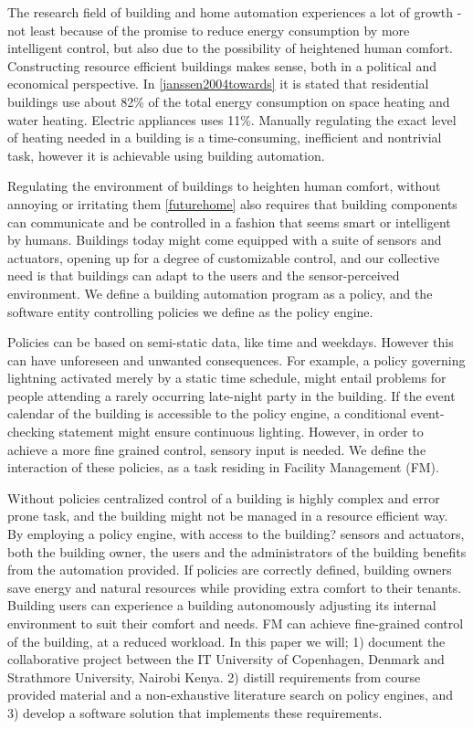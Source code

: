 The research field of building and home automation experiences a lot of growth - not least because of the promise to reduce energy consumption by more intelligent control, but also due to the possibility of heightened human comfort. Constructing resource efficient buildings makes sense, both in a political and economical perspective. In \ref{janssen2004towards} it is stated that residential buildings use about 82\% of the total energy consumption on space heating and water heating. Electric appliances uses 11\%. Manually regulating the exact level of heating needed in a building is a time-consuming, inefficient and nontrivial task, however it is achievable using building automation. 

Regulating the environment of buildings to heighten human comfort, without annoying or irritating them \ref{futurehome} also requires that building components can communicate and be controlled in a fashion that seems smart or intelligent by humans. Buildings today might come equipped with a suite of sensors and actuators, opening up for a degree of customizable control, and our collective need is that buildings can adapt to the users and the sensor-perceived environment. We define a building automation program as a policy, and the software entity controlling policies we define as the policy engine.

Policies can be based on semi-static data, like time and weekdays. However this can have unforeseen and unwanted consequences. For example, a policy governing lightning activated merely by a static time schedule, might entail problems for people attending a rarely occurring late-night party in the building. If the event calendar of the building is accessible to the policy engine, a conditional event-checking statement might ensure continuous lighting. However, in order to achieve a more fine grained control, sensory input is needed. We define the interaction of these policies, as a task residing in Facility Management (FM). 

Without policies centralized control of a building is highly complex and error prone task, and the building might not be managed in a resource efficient way. By employing a policy engine, with access to the building? sensors and actuators, both the building owner, the users and the administrators of the building benefits from the automation provided. If policies are correctly defined, building owners save energy and natural resources while providing extra comfort to their tenants. Building users can experience a building autonomously adjusting its internal environment to suit their comfort and needs. FM can achieve fine-grained control of the building, at a reduced workload. 
\newpage
In this paper we will; 1) document the collaborative project between the IT University of Copenhagen, Denmark and Strathmore University, Nairobi Kenya. 2) distill requirements from course provided material and a non-exhaustive literature search on policy engines, and 3) develop a software solution that implements these requirements.

